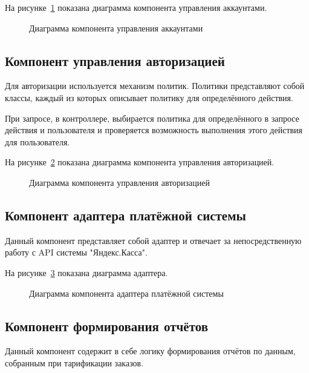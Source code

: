 На рисунке~\ref{fig:accounts_control_scheme} показана диаграмма компонента управления аккаунтами.
\begin{figure}[ht]
  \caption{Диаграмма компонента управления аккаунтами}\label{fig:accounts_control_scheme}
\end{figure}

\subsection{Компонент управления авторизацией}\label{sec:subs6}
Для авторизации используется механизм политик. Политики представляют собой классы, каждый из которых описывает политику для определённого действия.


При запросе, в контроллере, выбирается политика для определённого в запросе действия и пользователя и проверяется возможность выполнения этого действия для пользователя.


На рисунке~\ref{fig:authorize_control_scheme} показана диаграмма компонента управления авторизацией.
\begin{figure}[ht]
  \caption{Диаграмма компонента управления авторизацией}\label{fig:authorize_control_scheme}
\end{figure}

\subsection{Компонент адаптера платёжной системы}\label{sec:subs7}
Данный компонент представляет собой адаптер и отвечает за непосредственную работу с API системы "Яндекс.Касса".

На рисунке~\ref{fig:pay_adapter_scheme} показана диаграмма адаптера.
\begin{figure}[ht]
  \caption{Диаграмма компонента адаптера платёжной системы}\label{fig:pay_adapter_scheme}
\end{figure}

\subsection{Компонент формирования отчётов}\label{sec:subs8}
Данный компонент содержит в себе логику формирования отчётов по данным, собранным при тарификации заказов.

